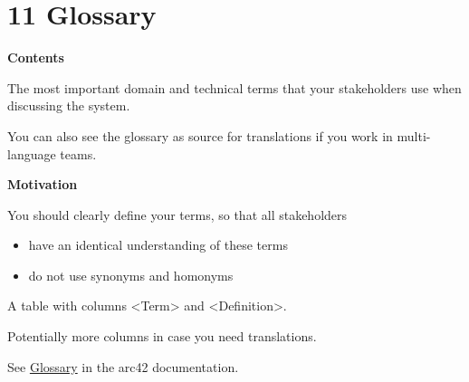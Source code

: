 \hypertarget{section-glossary}{%
\section{11 Glossary}\label{section-glossary}}

\textbf{Contents}

The most important domain and technical terms that your stakeholders use
when discussing the system.

You can also see the glossary as source for translations if you work in
multi-language teams.

\textbf{Motivation}

You should clearly define your terms, so that all stakeholders

\begin{itemize}
\item
  have an identical understanding of these terms
\item
  do not use synonyms and homonyms
\end{itemize}

A table with columns \textless Term\textgreater{} and
\textless Definition\textgreater.

Potentially more columns in case you need translations.

See \href{https://docs.arc42.org/section-12/}{Glossary} in the arc42
documentation.

